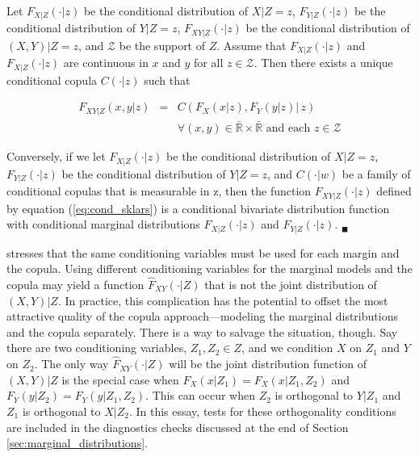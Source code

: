 \begin{theorem}[Patton, 2006] \label{thm:cond_skl}
	Let $F_{X|Z}(\cdot|z)$ be the conditional distribution of $X|Z=z$, $F_{Y|Z}(\cdot|z)$ be the conditional distribution of $Y|Z=z$, $F_{XY|Z}(\cdot|z)$ be the conditional distribution of $(X, Y)|Z = z$, and $\mathcal{Z}$ be the support of $Z$. Assume that $F_{X|Z}(\cdot|z)$ and $F_{X|Z}(\cdot|z)$ are continuous in $x$ and $y$ for all $z \in \mathcal{Z}$. Then there exists a unique conditional copula $C(\cdot|z)$ such that

	\begin{eqnarray}
		F_{XY|Z}\left(x,y|z\right) & = & C\left(F_{X}\left(x|z\right), F_{Y}\left(y|z\right)|\,z\right)  \label{eq:cond_sklars} \\
		 & &\forall(x, y) \in \bar{\mathbb{R}} \times \bar{\mathbb{R}} \text{ and each } z \in \mathcal{Z} \nonumber
	\end{eqnarray}

	Conversely, if we let $F_{X|Z}(\cdot|z)$ be the conditional distribution of $X|Z=z$, $F_{Y|Z}(\cdot|z)$ be the conditional distribution of $Y|Z=z$, and {$C(\cdot|w)$} be a family of conditional copulas that is measurable in z, then the function $F_{XY|Z}(\cdot|z)$ defined by equation (\ref{eq:cond_sklars}) is a conditional bivariate distribution function with conditional marginal distributions $F_{X|Z}(\cdot|z)$ and $F_{Y|Z}(\cdot|z)$.  $_{\blacksquare}$
\end{theorem}

\cite{Patton_2006} stresses that the same conditioning variables must be used for each margin and the copula. Using different conditioning variables for the marginal models and the copula may yield a function $\hat{F}_{XY}\left(\cdot|Z\right)$ that is not the joint distribution of $\left(X,Y\right)|Z$. In practice, this complication has the potential to offset the most attractive quality of the copula approach---modeling the marginal distributions and the copula separately. There is a way to salvage the situation, though. Say there are two conditioning variables, $Z_{1}, Z_{2} \in Z$, and we condition $X$ on $Z_{1}$ and $Y$ on $Z_{2}$. The only way $\hat{F}_{XY}\left(\cdot|Z\right)$ will be the joint distribution function of $\left(X,Y\right)|Z$ is the special case when $F_{X}\left(x|Z_{1}\right) = F_{X}\left(x|Z_{1},Z_{2}\right)$ and $F_{Y}\left(y|Z_{2}\right) = F_{Y}\left(y|Z_{1},Z_{2}\right)$. This can occur when $Z_{2}$ is orthogonal to $Y|Z_{1}$ and $Z_{1}$ is orthogonal to $X|Z_{2}$. In this essay, tests for these orthogonality conditions are included in the diagnostics checks discussed at the end of Section \ref{sec:marginal_distributions}.


